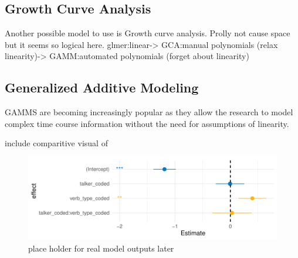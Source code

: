 \subsection{Growth Curve Analysis}

Another possible model to use is Growth curve analysis. Prolly not cause space but it seems so logical here. glmer:linear-> GCA:manual polynomials (relax linearity)-> GAMM:automated polynomials (forget about linearity)


\subsection{Generalized Additive Modeling}




GAMMS are becoming increasingly popular as they allow the research to model complex time course information without the need for assumptions of linearity.

include comparitive visual of 
\begin{figure}[h]
    \centering
    \includegraphics[width=\textwidth]{figures/model_gamm_effects.pdf}
    \caption{place holder for real model outputs later}
    \label{fig:model_outputs}
\end{figure}